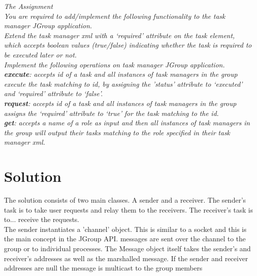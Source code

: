 \textit{The Assignment}\\

\textit{You are required to add/implement the following functionality to the task manager JGroup application.}\\

\textit{Extend the task manager xml with a ‘required’ attribute on the task element, which accepts boolean values (true/false) indicating whether the task is required to be executed later or not.}\\

\textit{Implement the following operations on task manager JGroup application.}\\

\textit{\textbf{execute}: accepts id of a task and all instances of task managers in the group execute the task matching to id, by assigning the ’status’ attribute to ‘executed’ and ‘required’ attribute to ‘false’.}\\

\textit{\textbf{request}: accepts id of a task and  all instances of task managers in the group assigns the ‘required’ attribute to ‘true’ for the task matching to the id.}\\

\textit{\textbf{get}: accepts a name of a role as input and then all instances of task managers in the group will output their tasks matching to the role specified in their task manager xml.}\\




\section{Solution}
\label{jgroup_solution}

The solution consists of two main classes. A sender and a receiver. The sender's task is to take user requests and relay them to the receivers.
The receiver's task is to... receive the requests. \\ 

The sender instantiates a 'channel' object. This is similar to a socket and this is the main concept in the JGroup API. messages are sent 
over the channel to the group or to individual processes.  The Message object itself takes the sender's and receiver's addresses as well as the marshalled message. If the sender and receiver addresses are null the message is multicast to the group members\\

